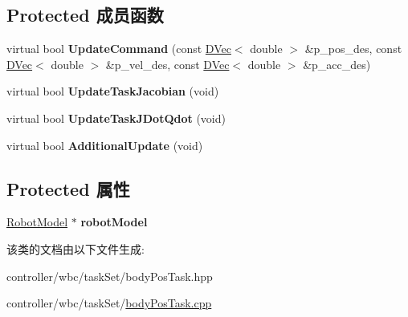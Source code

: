 \subsection*{Protected 成员函数}
\begin{DoxyCompactItemize}
\item 
\mbox{\label{classquadruped_1_1BodyPosTask_a252a17077072aa17e605039aaaa904d5}} 
virtual bool {\bfseries Update\+Command} (const \hyperlink{cppTypes_8h_adad69baca3c77d5f991be5d3c063fea7}{D\+Vec}$<$ double $>$ \&p\+\_\+pos\+\_\+des, const \hyperlink{cppTypes_8h_adad69baca3c77d5f991be5d3c063fea7}{D\+Vec}$<$ double $>$ \&p\+\_\+vel\+\_\+des, const \hyperlink{cppTypes_8h_adad69baca3c77d5f991be5d3c063fea7}{D\+Vec}$<$ double $>$ \&p\+\_\+acc\+\_\+des)
\item 
\mbox{\label{classquadruped_1_1BodyPosTask_a6b186be3525538677f261a91d574fea2}} 
virtual bool {\bfseries Update\+Task\+Jacobian} (void)
\item 
\mbox{\label{classquadruped_1_1BodyPosTask_a73b5e34cea057b2f9e84b207a40d9a37}} 
virtual bool {\bfseries Update\+Task\+J\+Dot\+Qdot} (void)
\item 
\mbox{\label{classquadruped_1_1BodyPosTask_a1654f33f0e1435b97811a037b2d6f9ea}} 
virtual bool {\bfseries Additional\+Update} (void)
\end{DoxyCompactItemize}
\subsection*{Protected 属性}
\begin{DoxyCompactItemize}
\item 
\mbox{\label{classquadruped_1_1BodyPosTask_ab6b7abbe217b1d765e0fd1e0a44d0d8e}} 
\hyperlink{classquadruped_1_1RobotModel}{Robot\+Model} $\ast$ {\bfseries robot\+Model}
\end{DoxyCompactItemize}


该类的文档由以下文件生成\+:\begin{DoxyCompactItemize}
\item 
controller/wbc/task\+Set/body\+Pos\+Task.\+hpp\item 
controller/wbc/task\+Set/\hyperlink{bodyPosTask_8cpp}{body\+Pos\+Task.\+cpp}\end{DoxyCompactItemize}

